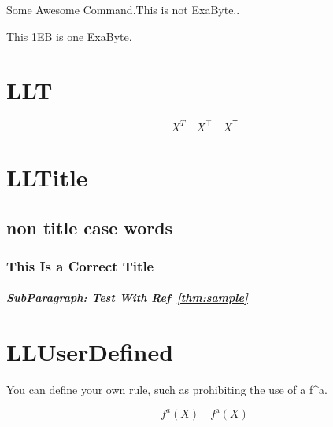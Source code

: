 \documentclass[a4paper, 10pt]{article}
\begin{document}
\newcommand{\EB}{Some Awesome Command.This is not ExaByte.}

\EB.

This 1EB is one ExaByte.

\section{LLT}

\begin{equation*}
    X^T \quad X^\top \quad X^{\mathsf{T}}
\end{equation*}

\section{LLTitle}

\subsection{non title case words}

\subsubsection{
    This Is a Correct Title
}

\subparagraph{SubParagraph: Test With Ref~\ref{thm:sample}}

\section{LLUserDefined}

You can define your own rule, such as prohibiting the use of a f\^{}a.

\begin{equation*}
    f^a(X) \quad f^{\mathrm{a}}(X)
\end{equation*}
\end{document}
